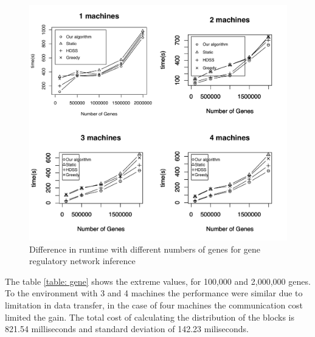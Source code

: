 \documentclass[journal]{IEEEtran}
\begin{document}
\begin{figure}[htb]
	\begin{center}
	\centering
			\includegraphics[scale=0.4]{GraficoFabrizio4maquinasNOVO.pdf}
	\caption{Difference in runtime with different numbers of genes for gene regulatory network inference}
	\label{fig:Gene}
	\end{center}
\end{figure}

The table \ref{table: gene} shows the extreme values​​, for 100,000 and 2,000,000 genes. 
To the environment with 3 and 4 machines the performance were similar due to limitation in data transfer, in the case of four machines the communication cost limited the gain. The total cost of calculating the distribution of the blocks is 821.54
milliseconds and standard deviation of 142.23 miliseconds.
\end{document}
